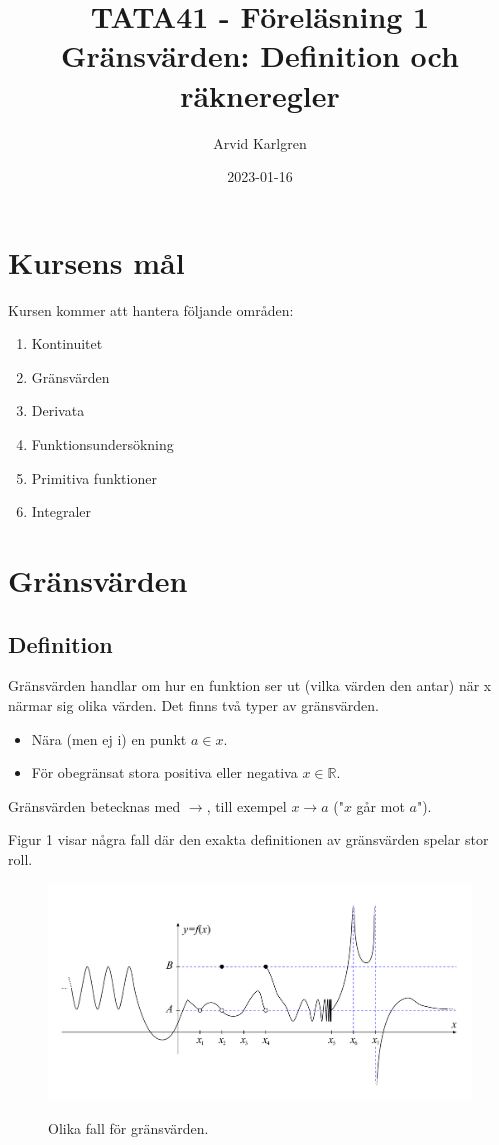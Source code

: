 \documentclass[swedish]{article}
\author{Arvid Karlgren}
\title{TATA41 - Föreläsning 1\\
\LARGE Gränsvärden: Definition och räkneregler}
\date{2023-01-16}
\begin{document}
\maketitle


\pagebreak

\section{Kursens mål}

Kursen kommer att hantera följande områden:

\begin{enumerate}
    \item Kontinuitet
    \item Gränsvärden
    \item Derivata
    \item Funktionsundersökning
    \item Primitiva funktioner
    \item Integraler
\end{enumerate}

\pagebreak

\section{Gränsvärden}

\subsection{Definition}

Gränsvärden handlar om hur en funktion ser ut (vilka värden den antar) när x närmar sig olika värden. Det finns två typer av gränsvärden.

\begin{itemize}
    \item{Nära (men ej i) en punkt $a\in x$.}
    \item{För obegränsat stora positiva eller negativa $x\in \mathbb{R}$.}
\end{itemize}

Gränsvärden betecknas med $\to$, till exempel $x \to a$ ("$x$ går mot $a$").

Figur 1 visar några fall där den exakta definitionen av gränsvärden spelar stor roll. 

\begin{figure}[h!]
    \includegraphics[width=14cm]{./figurer/figur1.png}
    \label{fig:figur1}
    \caption{Olika fall för gränsvärden.}
\end{figure}
\end{document}
